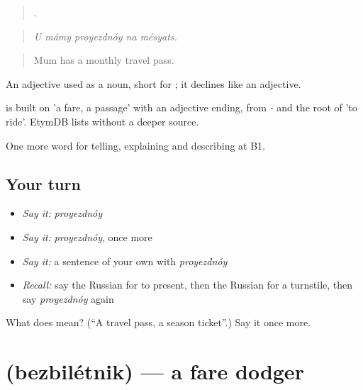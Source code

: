 \begin{quote}
    .
\end{quote}

\begin{quote}
\emph{U mámy proyezdnóy na mésyats.}
\end{quote}

\begin{quote}
Mum has a monthly travel pass.
\end{quote}

An adjective used as a noun, short for \emph{ }; it declines like an adjective.

\begin{cousinweb}
\emph{} is built on \emph{} 'a fare, a passage' with an adjective ending, from \emph{-} and the root of \emph{} 'to ride'. EtymDB lists \emph{} without a deeper source.
\end{cousinweb}

\begin{grammarlens}[title={What you've built}]
One more word for telling, explaining and describing at B1.
\end{grammarlens}

\subsection*{Your turn}
\begin{itemize}
\raggedright
  \item \emph{Say it:} \emph{proyezdnóy}
  \item \emph{Say it:} \emph{proyezdnóy}, once more
  \item \emph{Say it:} a sentence of your own with \emph{proyezdnóy}
  \item \emph{Recall:} say the Russian for to present, then the Russian for a turnstile, then say \emph{proyezdnóy} again
\end{itemize}

\begin{tcolorbox}[breakable,colback=teal!4,colframe=teal!35!black,title={Before you move on}]
What does  mean? (\textquotedblleft{}A travel pass, a season ticket\textquotedblright{}.) Say it once more.
\end{tcolorbox}
\section[\texorpdfstring{\ru{безбилетник} (bezbilétnik)}{безбилетник (bezbilétnik)}]{ (bezbilétnik) — a fare dodger}

